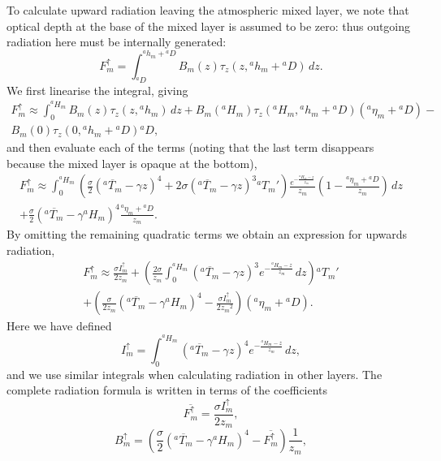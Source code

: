 \documentclass[11pt, a4paper,twoside]{article}
\newcommand{\etb}[2]{{{}^{#1}\eta_{#2}}}
\newcommand{\HH}[2]{{{}^{#1}H_{#2}}}
\newcommand{\h}[2]{{{}^{#1}h_{#2}}}
\newcommand{\T}[2]{{{}^{#1}T_{#2}}}
\newcommand{\bup}[1]{B^{\uparrow}_{#1}}
\newcommand{\iup}[1]{I^{\uparrow}_{#1}}
\newcommand{\Fup}[1]{{F^{\uparrow}_{#1}}}
\newcommand{\B}[1]{{B_{#1}}}
\newcommand{\D}[1]{{}^{#1}D}
\numberwithin{equation}{section}
\begin{document}
\begin{description}
To calculate upward radiation leaving the atmospheric mixed layer, we note that optical depth at the base of the mixed layer is assumed to be zero: thus outgoing radiation here must be internally generated:
\begin{equation}
\Fup{m} = \int_{\D{a}}^{\h{a}{m}+\D{a}} \B{m}(z) {\tau_z(z,\h{a}{m}+\D{a})} \, dz.
\end{equation}
We first linearise the integral, giving
\begin{multline}
\Fup{m} \approx \int_0^{\HH{a}{m}} \B{m}(z) {\tau_z(z,\h{a}{m})} \,dz + \B{m}(\HH{a}{m}) {\tau_z(\HH{a}{m} ,\h{a}{m}+\D{a})}(\etb{a}{m}+\D{a}) - \\
\B{m}(0) \tau_z(0,\h{a}{m}+\D{a})\D{a},
\end{multline}
and then evaluate each of the terms (noting that the last term disappears because the mixed layer is opaque at the bottom),
\begin{multline}
\Fup{m} \approx \int_0^{ \HH{a}{m} } \left(\frac{\sigma}{2}(\overline{\T{a}{m}} - \gamma z)^4 + 2\sigma \left(\overline{\T{a}{m}} - \gamma z\right)^3\T{a}{m}'\right) \frac{e^{-\frac{\HH{a}{m} - z}{z_m}}}{z_m}\left(1 - \frac{\etb{a}{m}+\D{a}}{z_m}\right)  \,dz \\
+ \frac{\sigma}{2} \left(\overline{\T{a}{m}} - \gamma \HH{a}{m} \right)^4 \frac{\etb{a}{m}+\D{a}}{z_m} .
\end{multline}
By omitting the remaining quadratic terms we obtain an expression for upwards radiation,
\begin{multline}
\Fup{m} \approx \frac{\sigma \iup{m}}{2 z_m} + \left(\frac{2\sigma}{z_m} \int_0^{ \HH{a}{m} } \left( \overline{ \T{a}{m} } - \gamma z \right)^3 e^{ - \frac{ \HH{a}{m} - z }{ z_m } } \,dz \right)  \T{a}{m}' \\
+ \left(\frac{\sigma}{2 z_m}(\overline{\T{a}{m}} - \gamma \HH{a}{m} )^4  - \frac{\sigma \iup{m}}{2 {z_m}^2}\right)(\etb{a}{m}+\D{a}) .
\end{multline}
Here we have defined
\[\iup{m} = \int_0^{ \HH{a}{m} } \left(\overline{\T{a}{m}} - \gamma z\right)^4 e^{-\frac{\HH{a}{m}- z}{z_m}}  \,dz,\]
and we use similar integrals when calculating radiation in other layers.
The complete radiation formula is written in terms of the coefficients
\begin{equation}
\overline{\Fup{m}} = \frac{\sigma\iup{m}}{2 z_m},
\end{equation}
\begin{equation}
 \bup{m} =\left( \frac{\sigma}{2}(\overline{\T{a}{m}} - \gamma \HH{a}{m})^4  - \overline{\Fup{m}}\right) \frac{1}{ z_m} ,

\end{equation}
\end{description}
\end{document}

